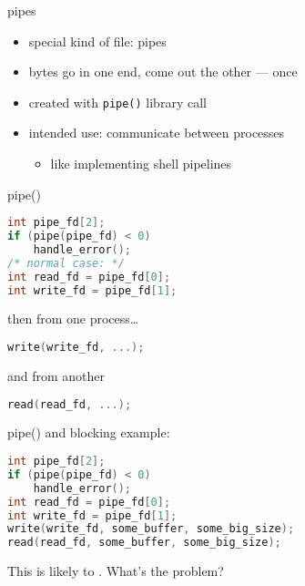 \begin{frame}{pipes}
\begin{itemize}
\item special kind of file: pipes
\item bytes go in one end, come out the other --- once
\vspace{.5cm}
\item created with \texttt{pipe()} library call
\item intended use: communicate between processes
    \begin{itemize}
    \item like implementing shell pipelines
    \end{itemize}
\end{itemize}
\end{frame}

\begin{frame}[fragile,label=pipe]{pipe()}
\begin{lstlisting}[language=C++,style=small]
int pipe_fd[2];
if (pipe(pipe_fd) < 0)
    handle_error();
/* normal case: */
int read_fd = pipe_fd[0];
int write_fd = pipe_fd[1];
\end{lstlisting}
then from one process\ldots
\begin{lstlisting}[language=C++,style=small]
write(write_fd, ...);
\end{lstlisting}
and from another
\begin{lstlisting}[language=C++,style=small]
read(read_fd, ...);
\end{lstlisting}
\end{frame}

\begin{frame}[fragile,label=pipeAndBlocking]{pipe() and blocking}
 example:
\begin{lstlisting}[language=C++,style=small]
int pipe_fd[2];
if (pipe(pipe_fd) < 0)
    handle_error();
int read_fd = pipe_fd[0];
int write_fd = pipe_fd[1];
write(write_fd, some_buffer, some_big_size);
read(read_fd, some_buffer, some_big_size);
\end{lstlisting}
This is likely to . What's the problem?
\end{frame}

